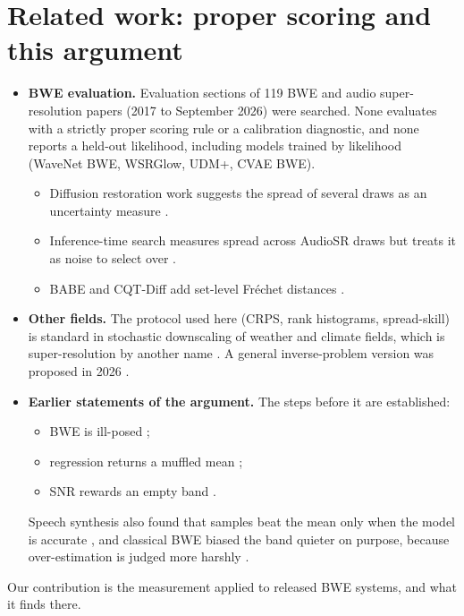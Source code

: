 \documentclass[10pt,letterpaper]{article}
\begin{document}
\section{Related work: proper scoring and this argument}\label{sec:related}
\begin{itemize}
\item \textbf{BWE evaluation.} Evaluation sections of 119 BWE and audio super-resolution papers (2017 to
September 2026) were searched. None evaluates with a strictly proper scoring rule or a calibration
diagnostic, and none reports a held-out likelihood, including models trained by likelihood (WaveNet BWE,
WSRGlow, UDM+, CVAE BWE).
\begin{itemize}
\item Diffusion restoration work suggests the spread of several draws as an uncertainty measure
\cite{lemercier2024}.
\item Inference-time search measures spread across AudioSR draws but treats it as noise to select over
\cite{jin2026}.
\item BABE and CQT-Diff add set-level Fr\'echet distances \cite{moliner2024}.
\end{itemize}
\item \textbf{Other fields.} The protocol used here (CRPS, rank histograms, spread-skill) is standard in
stochastic downscaling of weather and climate fields, which is super-resolution by another name
\cite{leinonen2021,harris2022,mardani2025}. A general inverse-problem version was proposed in 2026
\cite{baattrup2026}.
\item \textbf{Earlier statements of the argument.} The steps before it are established:
\begin{itemize}
\item BWE is ill-posed \cite{jax2002,bruna2016};
\item regression returns a muffled mean \cite{zen2009,lemercier2023storm,fu2026};
\item SNR rewards an empty band \cite{su2021,han2022}.
\end{itemize}
Speech synthesis also found that samples beat the mean only when the model is accurate \cite{henter2018}, and
classical BWE biased the band quieter on purpose, because over-estimation is judged more harshly
\cite{nilsson2001}.
\end{itemize}
Our contribution is the measurement applied to released BWE systems, and what it finds there.

\end{document}

